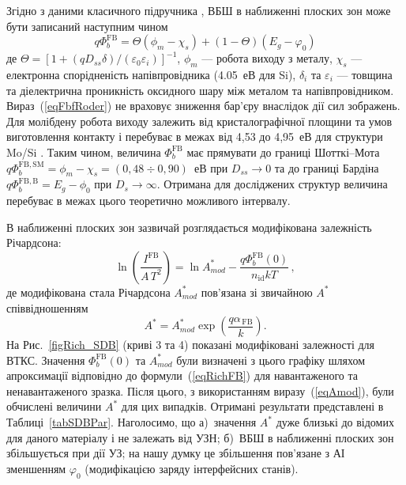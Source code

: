 Згідно з даними класичного підручника \cite{Rhoderick1988},
ВБШ в наближенні плоских зон може бути записаний наступним чином
\begin{equation}
\label{eqFbfRoder}
    q\Phi_{b}^\mathrm{FB}=\Theta(\phi_m-\chi_s)+(1-\Theta)(E_g-\varphi_0)
\end{equation}
де $\Theta=[1+(qD_{ss}\delta)/(\varepsilon_0\varepsilon_i)]^{-1}$,
$\phi_m$ --- робота виходу з металу,
$\chi_s$ --- електронна спорідненість напівпровідника (4.05~еВ для Si),
$\delta_i$ та $\varepsilon_i$ --- товщина та діелектрична проникність оксидного шару між металом та напівпровідником.
Вираз~(\ref{eqFbfRoder}) не враховує зниження бар'єру внаслідок дії сил зображень.
Для молібдену робота виходу залежить від кристалографічної площини та умов виготовлення контакту
і перебуває в межах від 4,53 до 4,95~еВ для структури Mo/Si \cite{MoWF2002}.
Таким чином, величина $\Phi_{b}^\mathrm{FB}$ має прямувати до границі Шотткі--Мота
$q\Phi_{b}^\mathrm{FB,SM}=\phi_m-\chi_s=(0,48\div0,90)$~еВ при $D_{ss}\rightarrow0$
та до границі Бардіна $q\Phi_{b}^\mathrm{FB,B}=E_g-\phi_0$ при $D_s\rightarrow\infty$.
Отримана для досліджених структур величина перебуває в межах цього теоретично можливого інтервалу.

В наближенні плоских зон зазвичай розглядається модифікована залежність Річардсона:
\begin{equation}
\label{eqRichFB}
\ln\left(\frac{I^\mathrm{FB}}{A\,T^2}\right)=\ln A^*_{mod}-\frac{q\Phi_{b}^\mathrm{FB}(0)}{n_\mathrm{id}kT}\,,
\end{equation}
де модифікована стала Річардсона $A^*_{mod}$  пов'язана зі звичайною $A^*$  співвідношенням
\begin{equation}
\label{eqAmod}
A^*=A^*_{mod}\exp\left(\frac{q\alpha_\mathrm{\,FB}}{k}\right).
\end{equation}
На Рис.~\ref{figRich_SDB} (криві 3 та 4) показані модифіковані залежності для ВТКС.
Значення $\Phi_{b}^\mathrm{FB}(0)$ та $A^*_{mod}$ були визначені з цього графіку шляхом апроксимації відповідно до формули~(\ref{eqRichFB})
для навантаженого та ненавантаженого зразка.
Після цього, з використанням виразу~(\ref{eqAmod}), були обчислені величини $A^*$ для цих випадків.
Отримані результати представлені в Таблиці~\ref{tabSDBPar}.
Наголосимо, що
а)~значення $A^*$ дуже близькі до відомих для даного матеріалу і не залежать від УЗН;
б)~ВБШ в наближенні плоских зон збільшується при дії УЗ;
на нашу думку це збільшення пов'язане з АІ зменшенням $\varphi_0$ (модифікацією заряду інтерфейсних станів).

